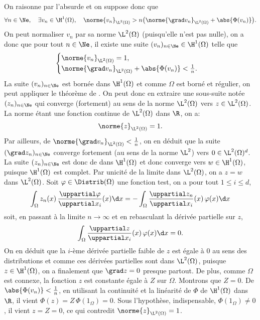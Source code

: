 \begin{demo}
On raisonne par l'absurde et on suppose donc que
\[
\forall n \in \Ne, \quad \exists v_n \in \H^1(\Omega), \quad \norme{v_n}_ {\L^2(\Omega)} > n \big( \norme{\grad v_n}_{\L^2(\Omega)} + \abs{\Phi(v_n)} \big).
\]
On peut normaliser $v_n$ par sa norme $\L^2(\Omega)$ (puisqu'elle n'est pas nulle), on a donc que pour tout $n \in \Ne$, il existe une suite $(v_n)_{n \in \Ne} \in \H^1(\Omega)$ telle que
\[
\begin{cases}
    \norme{v_n}_{\L^2(\Omega)} = 1,\\
    \norme{\grad v_n}_{\L^2(\Omega)} + \abs{\Phi(v_n)} < \frac{1}{n}.
\end{cases}
\]
La suite $(v_n)_{n \in \Ne}$ est bornée dans $\H^1(\Omega)$ et comme $\Omega$ est borné et régulier, on peut appliquer le théorème de . On peut donc en extraire une sous-suite notée $(z_n)_{n \in \Ne}$ qui converge (fortement) au sens de la norme $\L^2(\Omega)$ vers $z \in \L^2(\Omega)$. La norme étant une fonction continue de $\L^2(\Omega)$ dans $\R$, on a:
\[
\norme{z}_{\L^2(\Omega)} = 1.
\]
Par ailleurs, de $\norme{\grad v_n}_{\L^2(\Omega)} < \frac{1}{n}$, on en déduit que la suite $(\grad z_n)_{n \in \Ne}$ converge fortement (au sens de la norme $\L^2$) vers $0 \in \L^2(\Omega)^d$. La suite $(z_n)_{n \in \Ne}$ est donc de  dans $\H^1(\Omega)$ et donc converge vers $w \in \H^1(\Omega)$, puisque $\H^1(\Omega)$ est complet. Par unicité de la limite dans $\L^2(\Omega)$, on a $z = w$ dans $\L^2(\Omega)$. Soit $\varphi \in \Distrib(\Omega)$ une fonction test, on a pour tout $1 \leqslant i \leqslant d$,
\[
\int_\Omega z_n(x) \, \frac{\uppartial \varphi}{\uppartial x_i}(x) \d x = - \int_\Omega \frac{\uppartial z_n}{\uppartial x_i}(x) \, \varphi(x) \d x
\]
soit, en passant à la limite $n \to \infty$ et en rebasculant la dérivée partielle sur $z$,
\[
\int_\Omega \frac{\uppartial z}{\uppartial x_i}(x) \, \varphi(x) \d x = 0.
\]
On en déduit que la $i$-ème dérivée partielle faible de $z$ est égale à $0$ au sens des distributions et comme ces dérivées partielles sont dans $\L^2(\Omega)$, puisque $z \in \H^1(\Omega)$, on a finalement que $\grad z = 0$ presque partout. De plus, comme $\Omega$ est connexe, la fonction $z$ est constante égale à $Z$ sur $\Omega$. Montrons que $Z = 0$. De $\abs{\Phi(v_n)} < \frac{1}{n}$, en utilisant la continuité et la linéarité de $\Phi$ de $\H^1(\Omega)$ dans $\R$, il vient $\Phi(z) = Z \, \Phi(1_\Omega) = 0$. Sous l'hypothèse, indispensable, $\Phi(1_\Omega) \not= 0$, il vient $z = Z = 0$, ce qui contredit $\norme{z}_{\L^2(\Omega)} = 1$. 
\end{demo}

